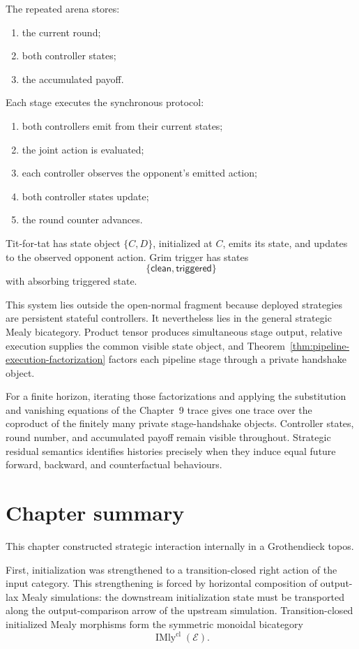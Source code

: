 The repeated arena stores:
\begin{enumerate}
  \item the current round;
  \item both controller states;
  \item the accumulated payoff.
\end{enumerate}
Each stage executes the synchronous protocol:
\begin{enumerate}
  \item both controllers emit from their current states;
  \item the joint action is evaluated;
  \item each controller observes the opponent's emitted action;
  \item both controller states update;
  \item the round counter advances.
\end{enumerate}

Tit-for-tat has state object \(\{C,D\}\), initialized at \(C\), emits its state, and updates to the
observed opponent action. Grim trigger has states
\[
  \{\mathsf{clean},\mathsf{triggered}\}
\]
with absorbing triggered state.

This system lies outside the open-normal fragment because deployed strategies are persistent
stateful controllers. It nevertheless lies in the general strategic Mealy bicategory. Product tensor
produces simultaneous stage output, relative execution supplies the common visible state object, and
Theorem~\ref{thm:pipeline-execution-factorization} factors each pipeline stage through a private
handshake object.

For a finite horizon, iterating those factorizations and applying the substitution and vanishing
equations of the Chapter~9 trace gives one trace over the coproduct of the finitely many private
stage-handshake objects. Controller states, round number, and accumulated payoff remain visible
throughout. Strategic residual semantics identifies histories precisely when they induce equal
future forward, backward, and counterfactual behaviours.

\section{Chapter summary}
\label{sec:strategic-mealy-games-summary}

This chapter constructed strategic interaction internally in a Grothendieck topos.

First, initialization was strengthened to a transition-closed right action of the input category.
This strengthening is forced by horizontal composition of output-lax Mealy simulations: the
downstream initialization state must be transported along the output-comparison arrow of the
upstream simulation. Transition-closed initialized Mealy morphisms form the symmetric monoidal
bicategory
\[
  \operatorname{IMly}^{\mathrm{cl}}(\mathcal E).
\]

